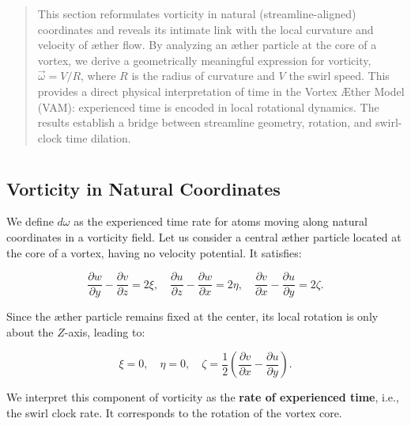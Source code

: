 \documentclass[12pt]{article}
\begin{document}
    \titlepageOpen

    \begin{abstract}
        This section reformulates vorticity in natural (streamline-aligned) coordinates and reveals its intimate link with the local curvature and velocity of æther flow. By analyzing an æther particle at the core of a vortex, we derive a geometrically meaningful expression for vorticity, \(\vec{\omega} = V / R\), where \(R\) is the radius of curvature and \(V\) the swirl speed. This provides a direct physical interpretation of time in the Vortex Æther Model (VAM): experienced time is encoded in local rotational dynamics. The results establish a bridge between streamline geometry, rotation, and swirl-clock time dilation.
    \end{abstract}


    \titlepageClose
    \fi

    \section{\appendixtitle}
    \subsection{Vorticity in Natural Coordinates}

    We define \( d\omega \) as the experienced time rate for atoms moving along natural coordinates in a vorticity field. Let us consider a central æther particle located at the core of a vortex, having no velocity potential. It satisfies:

    \begin{equation}
        \frac{\partial w}{\partial y} - \frac{\partial v}{\partial z} = 2\xi, \quad
        \frac{\partial u}{\partial z} - \frac{\partial w}{\partial x} = 2\eta, \quad
        \frac{\partial v}{\partial x} - \frac{\partial u}{\partial y} = 2\zeta.
    \end{equation}

    Since the æther particle remains fixed at the center, its local rotation is only about the \(Z\)-axis, leading to:

    \begin{equation}
        \xi = 0, \quad \eta = 0, \quad \zeta = \frac{1}{2} \left( \frac{\partial v}{\partial x} - \frac{\partial u}{\partial y} \right).
    \end{equation}

    We interpret this component of vorticity as the \textbf{rate of experienced time}, i.e., the swirl clock rate. It corresponds to the rotation of the vortex core.
\end{document}

